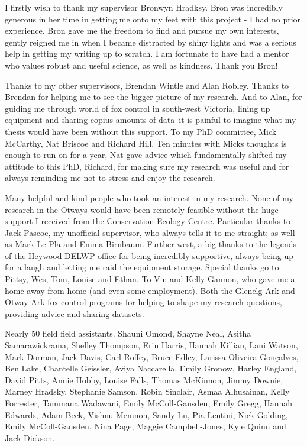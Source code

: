 \documentclass[11pt,a4paper,titlepage,twoside,openright]{style/unimelbthesis}
\begin{document}
\begin{frontmatter}
\begin{acknowledgements}
    I firstly wish to thank my supervisor Bronwyn Hradksy. Bron was incredibly generous in her time in getting me onto my feet with this project - I had no prior experience. Bron gave me the freedom to find and pursue my own interests, gently reigned me in when I became distracted by shiny lights and was a serious help in getting my writing up to scratch. I am fortunate to have had a mentor who values robust and useful science, as well as kindness. Thank you Bron!
    
    Thanks to my other supervisors, Brendan Wintle and Alan Robley. Thanks to Brendan for helping me to see the bigger picture of my research. And to Alan, for guiding me through world of fox control in south-west Victoria, lining up equipment and sharing copius amounts of data--it is painful to imagine what my thesis would have been without this support. To my PhD committee, Mick McCarthy, Nat Briscoe and Richard Hill. Ten minutes with Micks thoughts is enough to run on for a year, Nat gave advice which fundamentally shifted my attitude to this PhD, Richard, for making sure my research was useful and for always reminding me not to stress and enjoy the research.
    
    Many helpful and kind people who took an interest in my research. None of my research in the Otways would have been remotely feasible without the huge support I received from the Conservation Ecology Centre. Particular thanks to Jack Pascoe, my unofficial supervisor, who always tells it to me straight; as well as Mark Le Pla and Emma Birnbaum. Further west, a big thanks to the legends of the Heywood DELWP office for being incredibly supportive, always being up for a laugh and letting me raid the equipment storage. Special thanks go to Pittsy, Wes, Tom, Louise and Ethan. To Vin and Kelly Gannon, who gave me a home away from home (and even some employment). Both the Glenelg Ark and Otway Ark fox control programs for helping to shape my research questions, providing advice and sharing datasets.
    
    Nearly 50 field field assistants.
    Shauni Omond, Shayne Neal, Asitha Samarawickrama, Shelley Thompson, Erin Harris, Hannah Killian, Lani Watson, Mark Dorman, Jack Davis, Carl Roffey, Bruce Edley, Larissa Oliveira Gonçalves, Ben Lake, Chantelle Geissler, Aviya Naccarella, Emily Gronow, Harley England, David Pitts, Annie Hobby, Louise Falls, Thomas McKinnon, Jimmy Downie, Marney Hradsky, Stephanie Samson, Robin Sinclair, Asmaa Alhusainan, Kelly Forrester, Tammana Wadawani, Emily McColl-Gausden, Emily Gregg, Hannah Edwards, Adam Beck, Vishnu Memnon, Sandy Lu, Pia Lentini, Nick Golding, Emily McColl-Gausden, Nina Page, Maggie Campbell-Jones, Kyle Quinn and Jack Dickson.
    

\end{acknowledgements}
\end{frontmatter}
\end{document}
